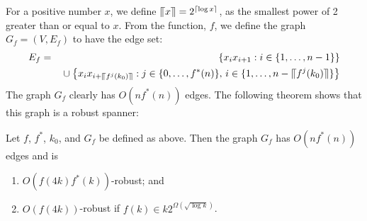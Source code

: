 \documentclass{patmorin}
\begin{document}
\newcommand{\upen}[1]{\llceil#1\rrceil}

For a positive number $x$, we define $\upen{x}=2^{\ceil{\log x}}$, as
the smallest power of 2 greater than or equal to $x$.  From the function,
$f$, we define the graph $G_f=(V,E_f)$ to have the edge set:
\begin{eqnarray*}
    E_f &=& \quad\left\{ x_ix_{i+1} : i\in\{1,\ldots,n-1\} \right\} \\
     && {} \cup \left\{ x_{i}x_{i+\upen{f^j(k_0)}} : j\in\{0,\ldots,f^*(n)\},\,
        i\in\{1,\ldots,n-\upen{f^j(k_0)}\} \right\}
\end{eqnarray*}
The graph $G_f$ clearly has $O(nf^*(n))$ edges.  The following theorem
shows that this graph is a robust spanner:

\begin{thm}
  Let $f$, $f^*$, $k_0$, and $G_f$ be defined as above.  Then the graph
  $G_f$ has $O(nf^*(n))$ edges and is
  \begin{enumerate}
    \item $O(f(4k)f^*(k))$-robust; and 
    \item $O(f(4k))$-robust if $f(k)\in k2^{\Omega(\sqrt{\log k})}$.
  \end{enumerate}
\end{thm}
\end{document}
